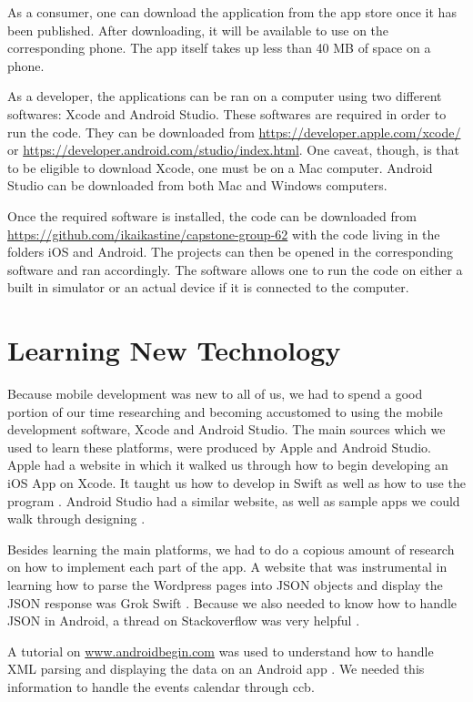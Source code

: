 \documentclass[letterpaper,10pt,draftclsnofoot,onecolumn,titlepage]{IEEEtran}
\begin{document}
As a consumer, one can download the application from the app store once it has been published.
After downloading, it will be available to use on the corresponding phone.
The app itself takes up less than 40 MB of space on a phone.

As a developer, the applications can be ran on a computer using two different softwares: Xcode and Android Studio.
These softwares are required in order to run the code.
They can be downloaded from \url{https://developer.apple.com/xcode/} or \url{https://developer.android.com/studio/index.html}.
One caveat, though, is that to be eligible to download Xcode, one must be on a Mac computer.
Android Studio can be downloaded from both Mac and Windows computers.

Once the required software is installed, the code can be downloaded from \url{https://github.com/ikaikastine/capstone-group-62} with the code living in the folders iOS and Android.
The projects can then be opened in the corresponding software and ran accordingly.
The software allows one to run the code on either a built in simulator or an actual device if it is connected to the computer.



\section{Learning New Technology}
Because mobile development was new to all of us, we had to spend a good portion of our time researching and becoming accustomed to using the mobile development software, Xcode and Android Studio.
The main sources which we used to learn these platforms, were produced by Apple and Android Studio.
Apple had a website in which it walked us through how to begin developing an iOS App on Xcode.
It taught us how to develop in Swift as well as how to use the program \cite{AppleSwift}.
Android Studio had a similar website, as well as sample apps we could walk through designing \cite{AndroidStudio}.

Besides learning the main platforms, we had to do a copious amount of research on how to implement each part of the app.
A website that was instrumental in learning how to parse the Wordpress pages into JSON objects and display the JSON response was Grok Swift \cite{JSONSwift}. Because we also needed to know how to handle JSON in Android, a thread on Stackoverflow was very helpful \cite{JSONAndroid}.

A tutorial on \url{www.androidbegin.com} was used to understand how to handle XML parsing and displaying the data on an Android app \cite{XMLAndroid}.
We needed this information to handle the events calendar through \gls{ccb}.
\end{document}
